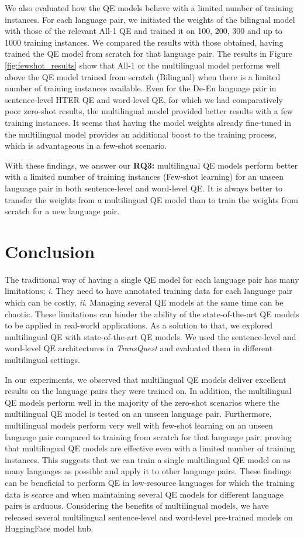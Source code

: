 We also evaluated how the QE models behave with a limited number of training instances. For each language pair, we initiated the weights of the bilingual model with those of the relevant All-1 QE and trained it on 100, 200, 300 and up to 1000 training instances. We compared the results with those obtained, having trained the QE model from scratch for that language pair. The results in Figure \ref{fig:fewshot_results} show that All-1 or the multilingual model performs well above the QE model trained from scratch (Bilingual) when there is a limited number of training instances available. Even for the De-En language pair in sentence-level HTER QE and word-level QE, for which we had comparatively poor zero-shot results, the multilingual model provided better results with a few training instances. It seems that having the model weights already fine-tuned in the multilingual model provides an additional boost to the training process, which is advantageous in a few-shot scenario.

With these findings, we answer our \textbf{RQ3:} multilingual QE models perform better with a limited number of training instances (Few-shot learning) for an unseen language pair in both sentence-level and word-level QE. It is always better to transfer the weights from a multilingual QE model than to train the weights from scratch for a new language pair.


\section{Conclusion}
\label{sec:multilingual_conclusion}
The traditional way of having a single QE model for each language pair has many limitations; \textit{i. }They need to have annotated training data for each language pair which can be costly, \textit{ii. }Managing several QE models at the same time can be chaotic.  These limitations can hinder the ability of the state-of-the-art QE models to be applied in real-world applications. As a solution to that, we explored multilingual QE with state-of-the-art QE models. We used the sentence-level and word-level QE architectures in \textit{TransQuest} and evaluated them in different multilingual settings. 

In our experiments, we observed that multilingual QE models deliver excellent results on the language pairs they were trained on. In addition, the multilingual QE models perform well in the majority of the zero-shot scenarios where the multilingual QE model is tested on an unseen language pair. Furthermore, multilingual models perform very well with few-shot learning on an unseen language pair compared to training from scratch for that language pair, proving that multilingual QE models are effective even with a limited number of training instances. This suggests that we can train a single multilingual QE model on as many languages as possible and apply it to other language pairs. These findings can be beneficial to perform QE in low-resource languages for which the training data is scarce and when maintaining several QE models for different language pairs is arduous. Considering the benefits of multilingual models, we have released several multilingual sentence-level and word-level pre-trained models on HuggingFace model hub. 

